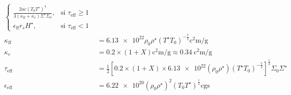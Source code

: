 \begin{align}
\begin{cases}
        \frac{2 a c \left(T_0 T^\star\right)^4}{3 (\kappa_\mathrm{ff} + \kappa_e)\Sigma^\star \Sigma_0}, &\text{si $\tau_\mathrm{eff} \geq 1$} \\
        \epsilon_\mathrm{ff} r_s H^\star, &\text{si $\tau_\mathrm{eff} < 1$}
    \end{cases} \\
    \kappa_\mathrm{ff} &= \num{6.13e22} \rho_0 \rho^\star \left(T^\star T_0\right)^{-\frac{7}{2}} \si{\square\centi\meter\per\gram} \\
    \kappa_e &= 0.2 \times (1 + X) \si{\square\centi\meter\per\gram} \approx \SI{0.34}{\square\centi\meter\per\gram} \\
    \tau_\mathrm{eff} &= \frac{1}{2} \left[ 0.2 \times (1 + X) \times \num{6.13e22} \left(\rho_0 \rho^\star\right) \left(T^\star T_0\right)^{-\frac{7}{2}} \right]^\frac{1}{2} \Sigma_0 \Sigma^\star \\
    \epsilon_\mathrm{eff} &= \num{6.22e20} (\rho_0 \rho^\star)^2 (T_0 T^\star)^\frac{1}{2} \text{cgs}
\end{align}
